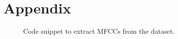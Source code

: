 \onecolumn
\newpage
\clearpage
\section{Appendix}

\begin{figure}[h]
  \centering
  
  \caption{Code snippet to extract MFCCs from the dataset.}
  \label{mfccsnip}
\end{figure}
